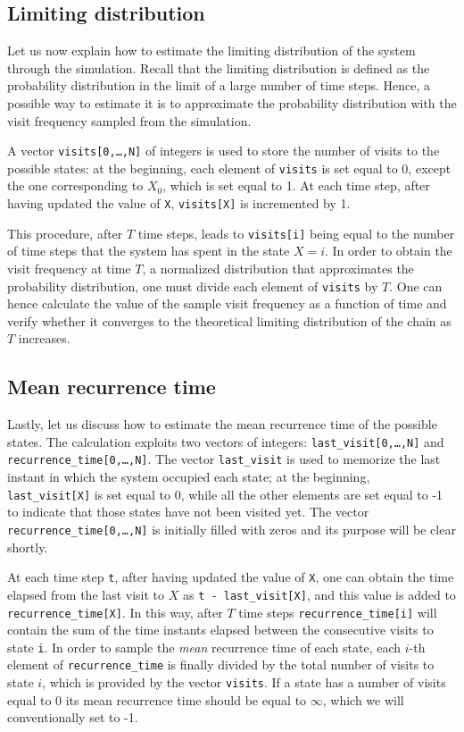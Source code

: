 \subsection{Limiting distribution}
Let us now explain how to estimate the limiting distribution of the system through the simulation. Recall that the limiting distribution is defined as the probability distribution in the limit of a large number of time steps. Hence, a possible way to estimate it is to approximate the probability distribution  with the visit frequency sampled from the simulation. 

A vector \texttt{visits[0,\dots,N]} of integers is used to store the number of visits to the possible states: at the beginning, each element of \texttt{visits} is set equal to 0, except the one corresponding to $X_0$, which is set equal to 1.  At each time step, after having updated the value of \texttt{X}, \texttt{visits[X]} is incremented by 1. 

This procedure, after $T$ time steps, leads to \texttt{visits[i]} being equal to the number of time steps that the system has spent in the state $X = i$. In order to obtain the visit frequency at time $T$, \ie a normalized distribution that approximates the probability distribution, one must divide each element of \texttt{visits} by $T$. One can hence calculate the value of the sample visit frequency as a function of time and verify whether it converges to the theoretical limiting distribution of the chain as $T$ increases.

\subsection{Mean recurrence time}
Lastly, let us discuss how to estimate the mean recurrence time of the possible states. The calculation exploits two vectors of integers: \texttt{last\_visit[0,\dots,N]} and \texttt{recurrence\_time[0,\dots,N]}. The vector \texttt{last\_visit} is used to memorize the last instant in which the system occupied each state; at the beginning, \texttt{last\_visit[X]} is set equal to 0, while all the other elements are set equal to -1 to indicate that those states have not been visited yet. The vector \texttt{recurrence\_time[0,\dots,N]} is initially filled with zeros and its purpose will be clear shortly.

At each time step \texttt{t}, after having updated the value of \texttt{X}, one can obtain the time elapsed from the last visit to $X$ as \texttt{t - last\_visit[X]}, and this value is added to \texttt{recurrence\_time[X]}. In this way, after $T$ time steps \texttt{recurrence\_time[i]} will contain the sum of the time instants elapsed between the consecutive visits to state \texttt{i}. In order to sample the \emph{mean} recurrence time of each state, each $i$-th element of \texttt{recurrence\_time} is finally divided by the total number of visits to state $i$, which is provided by the vector \texttt{visits}. If a state has a number of visits equal to 0 its mean recurrence time should be equal to $\infty$, which we will conventionally set to -1. 

